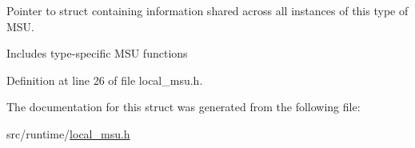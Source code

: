 Pointer to struct containing information shared across all instances of this type of M\-S\-U. 

Includes type-\/specific M\-S\-U functions 

Definition at line 26 of file local\-\_\-msu.\-h.



The documentation for this struct was generated from the following file\-:\begin{DoxyCompactItemize}
\item 
src/runtime/\hyperlink{local__msu_8h}{local\-\_\-msu.\-h}\end{DoxyCompactItemize}
